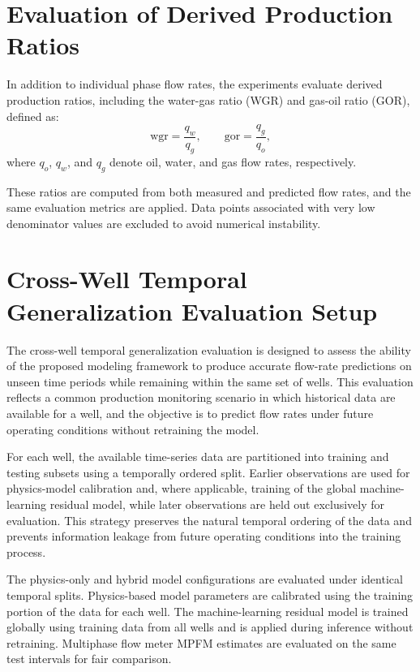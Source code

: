 \documentclass[12pt,APA]{uomthesis}
\begin{document}
\section{Evaluation of Derived Production Ratios}
In addition to individual phase flow rates, the experiments evaluate derived production ratios, including the water-gas ratio (WGR) and gas-oil ratio (GOR), defined as:
\begin{equation}
\text{wgr} = \frac{q_w}{q_g},
\qquad
\text{gor} = \frac{q_g}{q_o},
\end{equation}
where $q_o$, $q_w$, and $q_g$ denote oil, water, and gas flow rates, respectively.

These ratios are computed from both measured and predicted flow rates, and the same evaluation metrics are applied. Data points associated with very low denominator values are excluded to avoid numerical instability.

\section{Cross-Well Temporal Generalization Evaluation Setup}
\label{sec:temporal_setup}
The cross-well temporal generalization evaluation is designed to assess the ability of the proposed modeling framework to produce accurate flow-rate predictions on unseen time periods while remaining within the same set of wells. 
This evaluation reflects a common production monitoring scenario in which historical data are available for a well, and the objective is to predict flow rates under future operating conditions without retraining the model.

For each well, the available time-series data are partitioned into training and testing subsets using a temporally ordered split. Earlier observations are used for physics-model calibration and, where applicable, training of the global machine-learning residual model, while later observations are held out exclusively for evaluation. This strategy preserves the natural temporal ordering of the data and prevents information leakage from future operating conditions into the training process.

The physics-only and hybrid model configurations are evaluated under identical temporal splits. Physics-based model parameters are calibrated using the training portion of the data for each well. The machine-learning residual model is trained globally using training data from all wells and is applied during inference without retraining. Multiphase flow meter MPFM estimates are evaluated on the same test intervals for fair comparison.
\end{document}
